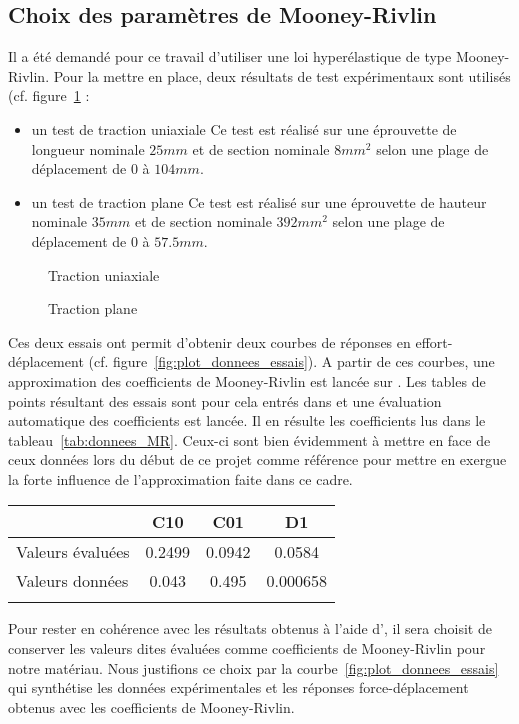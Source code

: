 ﻿ \documentclass{article}
\newcommand{\abaqus}{\bsc{Abaqus}\xspace}
\begin{document}
\subsection{Choix des paramètres de Mooney-Rivlin}

Il a été demandé pour ce travail d'utiliser une loi hyperélastique de type Mooney-Rivlin. Pour la mettre en place, deux résultats de test expérimentaux sont utilisés (cf. figure~\ref{fig:essais_exp} : 
\begin{itemize}
\item un test de traction uniaxiale
Ce test est réalisé sur une éprouvette de longueur nominale $25 mm$ et de section nominale $8 mm^2$ selon une plage de déplacement de $0$ à $104 mm$.
\item un test de traction plane
Ce test est réalisé sur une éprouvette de hauteur nominale $35 mm$ et de section nominale $392 mm^2$ selon une plage de déplacement de $0$ à $57.5 mm$.
\end{itemize}

\begin{figure}
\caption{Traction uniaxiale}
\caption{Traction plane}
\label{fig:essais_exp}
\end{figure}

Ces deux essais ont permit d'obtenir deux courbes de réponses en effort-déplacement (cf. figure~\ref{fig:plot_donnees_essais}). A partir de ces courbes, une approximation des coefficients de Mooney-Rivlin est lancée sur \abaqus. Les tables de points résultant des essais sont pour cela entrés dans \abaqus et une évaluation automatique des coefficients est lancée. Il en résulte les coefficients lus dans le tableau~\ref{tab:donnees_MR}. Ceux-ci sont bien évidemment à mettre en face de ceux données lors du début de ce projet comme référence pour mettre en exergue la forte influence de l'approximation faite dans ce cadre.

\begin{tabular}{|l|c|c|c|}
\hline
 & C10 & C01 & D1 \\ \hline
Valeurs évaluées & 0.2499 & 0.0942 & 0.0584 \\ \hline
Valeurs données & 0.043  & 0.495 & 0.000658 \\ \hline
\label{tab:donnees_MR}
\end{tabular} 

Pour rester en cohérence avec les résultats obtenus à l'aide d'\abaqus, il sera choisit de conserver les valeurs dites évaluées comme coefficients de Mooney-Rivlin pour notre matériau. Nous justifions ce choix par la courbe~\ref{fig:plot_donnees_essais} qui synthétise les données expérimentales et les réponses force-déplacement obtenus avec les coefficients de Mooney-Rivlin.
\end{document}
